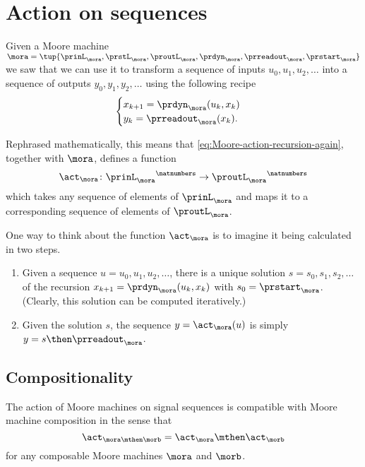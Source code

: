 
\section{Action on sequences}

Given a Moore machine $\mora = \tup{\prinL_\mora,\prstL_\mora,\proutL_\mora,\prdyn_\mora,\prreadout_\mora,\prstart_\mora}$
we saw that we can use it to transform a sequence of inputs $u_0, u_1, u_2, \dots$ into a sequence of outputs $y_0, y_1, y_2, \dots$ using the following recipe
\begin{equation}
    \label{eq:Moore-action-recursion-again}
    \begin{cases}
        x_{k+1} = \prdyn_\mora(u_k, x_k) \\
        y_{k}   = \prreadout_\mora(x_{k}).
    \end{cases}
\end{equation}

Rephrased mathematically, this means that \cref{eq:Moore-action-recursion-again}, together with $\mora$, defines a function $$ \act_{\mora} \colon {\prinL_\mora}^\natnumbers \to {\proutL_\mora}^\natnumbers$$ which takes any sequence  of elements of $\prinL_\mora$ and maps it to a corresponding sequence  of elements of $\proutL_\mora$.

\begin{remark}
    \label{re:moore-action-two-steps}
    One way to think about the function $\act_{\mora}$ is to imagine it being calculated in two steps.
    \begin{enumerate}
        \item Given a sequence $u = u_0, u_1, u_2, \dots$, there is a unique solution $s = s_0, s_1, s_2, \dots$ of the recursion $x_{k+1} = \prdyn_\mora(u_k, x_k)$ with $s_0 = \prstart_\mora$. (Clearly, this solution can be computed iteratively.)
        \item Given the solution $s$, the sequence $y = \act_{\mora}(u)$ is simply $y = s \then \prreadout_\mora$.
    \end{enumerate}
\end{remark}

\subsection{Compositionality}

\begin{proposition}
    The action of Moore machines on signal sequences is compatible with Moore machine composition in the sense that
    \begin{equation}
        \label{eq:moore-action-compositional}
        \act_{\mora \mthen \morb} = \act_\mora \mthen \act_\morb
    \end{equation}
    for any composable Moore machines $\mora$ and $\morb$.
\end{proposition}

